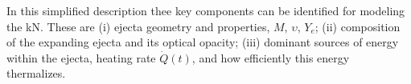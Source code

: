 

In this simplified description thee key components can be 
identified for modeling the \ac{kN}. These are 
(i) ejecta geometry and properties, $M$, $\upsilon$, $Y_e$; 
(ii) composition of the expanding ejecta and its optical opacity; 
(iii) dominant sources of energy within the ejecta, heating rate $\dot{Q}(t)$, and how 
efficiently this energy thermalizes.
%

